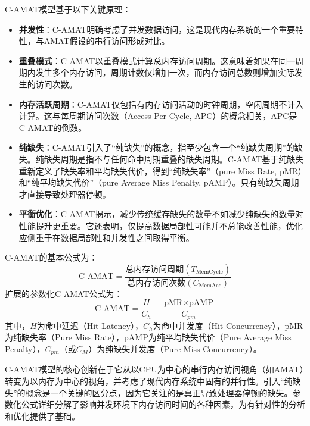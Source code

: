 \documentclass[UTF8]{ctexart}
\begin{document}
C-AMAT模型基于以下关键原理\cite{sunCAMATPage}：
\begin{itemize}
    \item \textbf{并发性}：C-AMAT明确考虑了并发数据访问，这是现代内存系统的一个重要特性，与AMAT假设的串行访问形成对比\cite{sunCAMATPage}。
    \item \textbf{重叠模式}：C-AMAT以重叠模式计算总内存访问周期。这意味着如果在同一周期内发生多个内存访问，周期计数仅增加一次，而内存访问总数则增加实际发生的访问次数\cite{sunCAMATPage}。
    \item \textbf{内存活跃周期}：C-AMAT仅包括有内存访问活动的时钟周期，空闲周期不计入计算\cite{sunCAMATPage}。这与每周期访问次数（Access Per Cycle, APC）的概念相关，APC是C-AMAT的倒数\cite{sunCAMATPage}。
    \item \textbf{纯缺失}：C-AMAT引入了“纯缺失”的概念，指至少包含一个“纯缺失周期”的缺失。纯缺失周期是指不与任何命中周期重叠的缺失周期\cite{illustrationCAMATPureMiss}。C-AMAT基于纯缺失重新定义了缺失率和平均缺失代价，得到“纯缺失率”（pure Miss Rate, pMR）和“纯平均缺失代价”（pure Average Miss Penalty, pAMP）\cite{sunCAMATPage}。只有纯缺失周期才直接导致处理器停顿\cite{feng2022proceedings}。
    \item \textbf{平衡优化}：C-AMAT揭示，减少传统缓存缺失的数量不如减少纯缺失的数量对性能提升更重要。它还表明，仅提高数据局部性可能并不总能改善性能，优化应侧重于在数据局部性和并发性之间取得平衡\cite{sunCAMATPage}。
\end{itemize}

C-AMAT的基本公式为\cite{sunCAMATPage}：
\[ \text{C-AMAT} = \frac{\text{总内存访问周期} (T_{\text{MemCycle}})}{\text{总内存访问次数} (C_{\text{MemAcc}})} \]
扩展的参数化C-AMAT公式为\cite{sunCAMATPage}：
\[ \text{C-AMAT} = \frac{H}{C_h} + \frac{\text{pMR} \times \text{pAMP}}{C_{pm}} \]
其中，$H$为命中延迟（Hit Latency），$C_h$为命中并发度（Hit Concurrency），pMR为纯缺失率（Pure Miss Rate），pAMP为纯平均缺失代价（Pure Average Miss Penalty），$C_{pm}$（或$C_M$）为纯缺失并发度（Pure Miss Concurrency）\cite{sunCAMATPage}。

C-AMAT模型的核心创新在于它从以CPU为中心的串行内存访问视角（如AMAT）转变为以内存为中心的视角，并考虑了现代内存系统中固有的并行性。引入“纯缺失”的概念是一个关键的区分点，因为它关注的是真正导致处理器停顿的缺失\cite{sunCAMATPage}。参数化公式详细分解了影响并发环境下内存访问时间的各种因素，为有针对性的分析和优化提供了基础。
\end{document}
